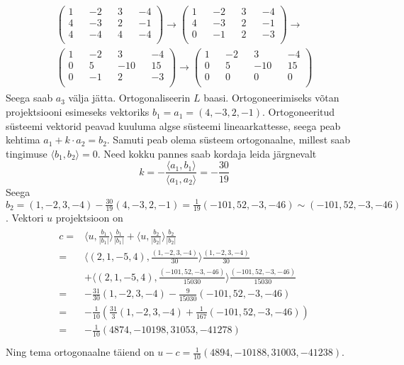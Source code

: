 \documentclass{article}
\begin{document}
\begin{gather*}
\begin{aligned}
\begin{pmatrix}
1 && -2 && 3 && -4\\
4 && -3 && 2 && -1\\
4 && -4 && 4 && -4\\
\end{pmatrix}\rightarrow
\begin{pmatrix}
1 && -2 && 3 && -4\\
4 && -3 && 2 && -1\\
0 && -1 && 2 && -3\\
\end{pmatrix}\rightarrow\\
\begin{pmatrix}
1 && -2 && 3 && -4\\
0 && 5 && -10 && 15\\
0 && -1 && 2 && -3\\
\end{pmatrix}\rightarrow
\begin{pmatrix}
1 && -2 && 3 && -4\\
0 && 5 && -10 && 15\\
0 && 0 && 0 && 0\\
\end{pmatrix}
\end{aligned}
\end{gather*}
Seega saab $a_3$ välja jätta. Ortogonaliseerin $L$ baasi. Ortogoneerimiseks võtan projektsiooni esimeseks vektoriks $b_1=a_1=(4,-3,2,-1)$. Ortogoneeritud süsteemi vektorid peavad kuuluma algse süsteemi lineaarkattesse, seega peab kehtima $a_1+k\cdot a_2=b_2$. Samuti peab olema süsteem ortogonaalne, millest saab tingimuse $\langle b_1,b_2\rangle=0$. Need kokku pannes saab kordaja leida järgnevalt $$k=-\frac{\langle a_1,b_1\rangle}{\langle a_1,a_2\rangle}=-\frac{30}{19}$$ Seega $b_2=(1,-2,3,-4)-\frac{30}{19}(4,-3,2,-1)=\frac{1}{19}(-101,52,-3,-46)\sim(-101,52,-3,-46)$.
Vektori $u$ projektsioon on 
\begin{gather*}
\begin{aligned}
c=&\langle u,\frac{b_1}{|b_1|}\rangle\frac{b_1}{|b_1|}+\langle u,\frac{b_2}{|b_2|}\rangle\frac{b_2}{|b_2|}\\
=&\langle (2,1,-5,4),\frac{(1,-2,3,-4)}{30}\rangle\frac{(1,-2,3,-4)}{30}\\
&+\langle (2,1,-5,4),\frac{(-101,52,-3,-46)}{15030}\rangle\frac{(-101,52,-3,-46)}{15030}\\
=&-\frac{31}{30}(1,-2,3,-4)-\frac{9}{15030}(-101,52,-3,-46)\\
=&-\frac{1}{10}\left(\frac{31}{3}(1,-2,3,-4)+\frac{1}{167}(-101,52,-3,-46)\right)\\
=&-\frac{1}{10}\left(4874,-10198,31053,-41278\right)\\
\end{aligned}
\end{gather*}
Ning tema ortogonaalne täiend on $u-c=\frac1{10}(4894,-10188,31003,-41238)$.\\
\end{document}
